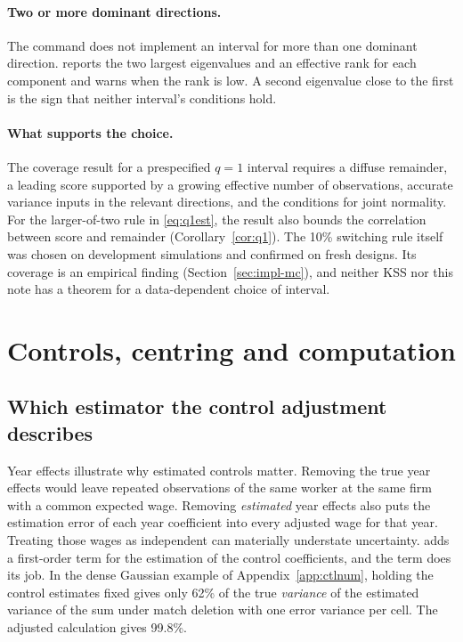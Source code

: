 \paragraph{Two or more dominant directions.}
The command does not implement an interval for more than one dominant direction.
 reports the two largest eigenvalues and an effective rank for
each component and warns when the rank is low. A second eigenvalue close to the first
is the sign that neither interval's conditions hold.

\paragraph{What supports the choice.}
The coverage result for a prespecified $q=1$ interval requires a diffuse
remainder, a leading score supported by a growing effective number of
observations, accurate variance inputs in the relevant directions, and the
conditions for joint normality. For the larger-of-two rule in \eqref{eq:q1est},
the result also bounds the correlation between score and remainder
(Corollary~\ref{cor:q1}). The 10\% switching rule itself was chosen on development
simulations and confirmed on fresh designs. Its coverage is an empirical
finding (Section~\ref{sec:impl-mc}), and neither KSS nor this note has a theorem for
a data-dependent choice of interval.

\section{Controls, centring and computation}\label{sec:controls}

\subsection{Which estimator the control adjustment describes}
Year effects illustrate why estimated controls matter. Removing the true year
effects would leave repeated observations of the same worker at the same firm
with a common expected wage. Removing \emph{estimated} year effects also puts
the estimation error of each year coefficient into every adjusted wage for
that year. Treating those wages as independent can materially understate
uncertainty. \fevc{} adds a first-order term for the estimation of the control
coefficients, and the term does its job. In the dense Gaussian example of
Appendix~\ref{app:ctlnum}, holding the control estimates fixed gives only 62\% of the
true \emph{variance} of the estimated variance of the sum under match deletion with
one error variance per cell. The adjusted calculation gives 99.8\%.

